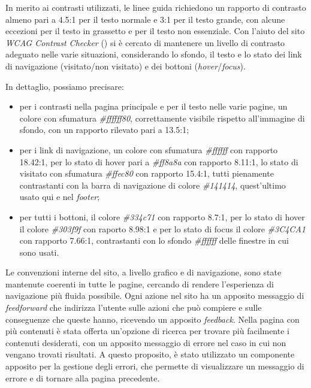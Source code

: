 In merito ai contrasti utilizzati, le linee guida richiedono un rapporto di contrasto almeno pari a 4.5:1 per il testo normale e 3:1 per il testo grande, con alcune eccezioni per il testo in grassetto e per il testo non essenziale.
Con l'aiuto del sito \textit{WCAG Contrast Checker} (\cite{site:wcagcontrastchecker}) si è cercato di mantenere un livello di contrasto adeguato nelle varie situazioni, considerando lo sfondo, il testo e lo stato dei link di navigazione (visitato/non visitato) e dei bottoni (\textit{hover}/\textit{focus}).

In dettaglio, possiamo precisare:
\begin{itemize}
    \item per i contrasti nella pagina principale e per il testo nelle varie pagine, un colore con sfumatura \textit{\#ffffff80}, correttamente visibile rispetto all'immagine di sfondo, con un rapporto rilevato pari a 13.5:1;
    \item per i link di navigazione, un colore con sfumatura \textit{\#ffffff} con rapporto 18.42:1, per lo stato di hover pari a \textit{\#ff8a8a} con rapporto 8.11:1, lo stato di visitato con sfumatura \textit{\#ffec80} con rapporto 15.4:1, tutti pienamente contrastanti con la barra di navigazione di colore \textit{\#141414}, quest'ultimo usato qui e nel \textit{footer};
    \item per tutti i bottoni, il colore \textit{\#334c71} con rapporto 8.7:1, per lo stato di hover il colore \textit{\#303f9f} con raporto 8.98:1 e per lo stato di focus il colore \textit{\#3C4CA1} con rapporto 7.66:1, contrastanti con lo sfondo \textit{\#ffffff} delle finestre in cui sono usati.
\end{itemize}

Le convenzioni interne del sito, a livello grafico e di navigazione, sono state mantenute coerenti in tutte le pagine, cercando di rendere l'esperienza di navigazione più fluida possibile.
Ogni azione nel sito ha un apposito messaggio di \textit{feedforward} che indirizza l'utente sulle azioni che può compiere e sulle conseguenze che queste hanno, ricevendo un apposito \textit{feedback}.
Nella pagina con più contenuti è stata offerta un'opzione di ricerca per trovare più facilmente i contenuti desiderati, con un apposito messaggio di errore nel caso in cui non vengano trovati risultati.
A questo proposito, è stato utilizzato un componente apposito per la gestione degli errori, che permette di visualizzare un messaggio di errore e di tornare alla pagina precedente. \\

